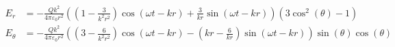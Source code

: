 \documentclass{article}
\begin{document}

\addtocounter{equation}{2}
\begin{align}
    E_r &= - \frac{Q k^{2}}{4\pi\varepsilon_0 r^{2}} \left(\left(1 - \frac{3}{k^{2} r^{2}}\right) \cos{\left(\omega t - k r \right )} + \frac{3}{k r} \sin{\left (\omega t - k r \right )}\right) \left(3 \cos^{2}{\left (\theta \right )} - 1\right) \\
  E_\theta &= - \frac{Q k^{2}}{4\pi\varepsilon_0 r^{2}} \left(\left(3 - \frac{6}{k^{2} r^{2}}\right) \cos{\left (\omega t - k r \right )} - \left(k r - \frac{6}{k r}\right) \sin{\left (\omega t - k r \right )}\right) \sin{\left (\theta \right )} \cos{\left (\theta \right )}
\end{align}
\end{document}
